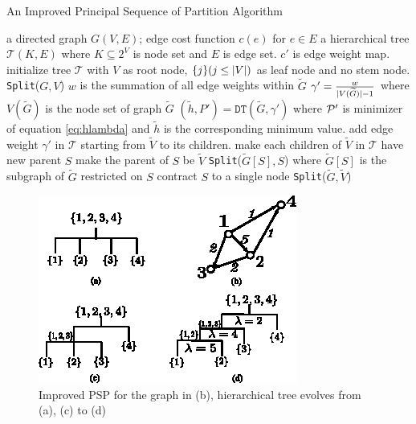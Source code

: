\documentclass[runningheads]{llncs}
\begin{document}
\begin{algorithm}
	\caption{An Improved Principal Sequence of Partition Algorithm}\label{alg:psp_i_simplified}
	\begin{algorithmic}[1]
		\REQUIRE a directed graph $G(V, E)$; edge cost function $c(e)$ for $e\in E$
		\ENSURE a hierarchical tree $\mathcal{T}(K, E)$ where $K \subseteq 2^{V}$ is node set and $E$ is edge set. $c'$ is edge weight map.
		\STATE initialize tree $\mathcal{T}$ with $V$ as root node, $\{j\}(j\leq \abs{V})$ as leaf node and no stem node.
		\STATE \texttt{Split}($G, V$)
		\STATE $w$ is the summation of all edge weights within $\widetilde{G}$ 
		\STATE $\gamma' = \frac{w}{\abs{V(\widetilde{G})}-1}$ where $V(\widetilde{G})$ is the node set of graph $\widetilde{G}$ \label{alg:gamma_apostrophe}
		\STATE $(\tilde{h}, P') = \texttt{DT}(\widetilde{G}, \gamma')$ where $\P'$ is minimizer of equation \eqref{eq:hlambda} and $\tilde{h}$ is the corresponding minimum value.  \label{alg:DT}
		\STATE add edge weight $\gamma'$ in $\mathcal{T}$ starting from $\widetilde{V}$ to its children.
		\ELSE
		\STATE make each children of $\widetilde{V}$ in $\mathcal{T}$ have new parent $S$		
		\STATE make the parent of $S$ be $\widetilde{V}$
		\STATE \texttt{Split}($\widetilde{G}[S], S$) where $\widetilde{G}[S]$ is the subgraph of $\widetilde{G}$ restricted on $S$
		\STATE contract $S$ to a single node %
		\ENDFOR 
		\STATE \texttt{Split}($\widetilde{G}, \widetilde{V}$)		
		\ENDIF
		\ENDFUNCTION
	\end{algorithmic}
\end{algorithm}
	
\begin{figure}[!ht]
	\includegraphics[width=\textwidth]{pic/alg_illustration.eps}
	\caption{Improved PSP for the graph in (b), hierarchical tree evolves from (a), (c) to (d) }\label{fig:alg_eg}
\end{figure}
\end{document}
